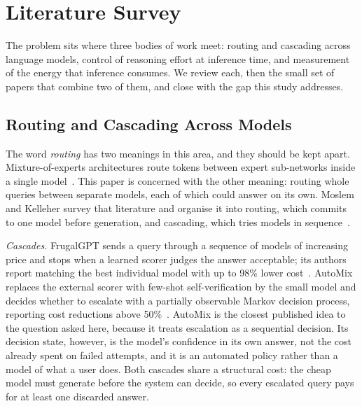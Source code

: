 \section{Literature Survey}
\label{sec:literature}

The problem sits where three bodies of work meet: routing and cascading
across language models, control of reasoning effort at inference time, and
measurement of the energy that inference consumes. We review each, then
the small set of papers that combine two of them, and close with the gap
this study addresses.

\subsection{Routing and Cascading Across Models}
\label{sec:lit-routing}

The word \emph{routing} has two meanings in this area, and they should be
kept apart. Mixture-of-experts architectures route tokens between expert
sub-networks inside a single model~\cite{fedus2022switch}. This paper is
concerned with the other meaning: routing whole queries between separate
models, each of which could answer on its own. Moslem and Kelleher survey
that literature and organise it into routing, which commits to one model
before generation, and cascading, which tries models in
sequence~\cite{moslem2026routingsurvey}.

\emph{Cascades.} FrugalGPT sends a query through a sequence of models of
increasing price and stops when a learned scorer judges the answer
acceptable; its authors report matching the best individual model with up
to 98\% lower cost~\cite{chen2023frugalgpt}. AutoMix replaces the external
scorer with few-shot self-verification by the small model and decides
whether to escalate with a partially observable Markov decision process,
reporting cost reductions above 50\%~\cite{aggarwal2024automix}. AutoMix is
the closest published idea to the question asked here, because it treats
escalation as a sequential decision. Its decision state, however, is the
model's confidence in its own answer, not the cost already spent on failed
attempts, and it is an automated policy rather than a model of what a user
does. Both cascades share a structural cost: the cheap model must generate
before the system can decide, so every escalated query pays for at least one
discarded answer.

